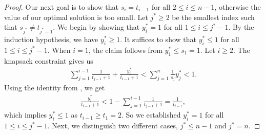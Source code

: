 \documentclass[pdflatex]{sn-jnl}
\theoremstyle{thmstyleone}%
\theoremstyle{thmstyletwo}%
\theoremstyle{thmstylethree}%
\begin{document}
\begin{proof}
		Our next goal is to show that $s_i = t_{i-1}$ for all $2\leq i\leq n-1$, otherwise the value of our optimal solution is too small. 
		Let $j^*\geq 2$ be the smallest index such that $s_{j^*} \neq t_{{j^*}-1}$. 
		We begin by showing that $y^*_i = 1$ for all $1\leq i\leq j^*-1$. By the induction hypothesis, we have $y^*_i \geq 1$. 
		It suffices to show that $y^*_i\leq 1$ for all $1\leq i \leq j^* - 1$. When $i = 1$, the claim follows from $y_1^*\leq s_1 = 1$. Let $i \geq 2$. The knapsack constraint gives us
		\begin{align*}
			\sum_{j=1}^{i-1}\frac{1}{t_{j-1} + 1} + \frac{y^*_{i}}{t_{i-1} + 1} < \sum_{j=1}^n \frac{1}{s_j}y^*_j < 1.
		\end{align*}
		Using the identity from \cite{sylvestersequence1880sylvester}, we get 
		\begin{align*}
			\frac{y^*_{i}}{t_{i-1} + 1} < 1 - \sum_{j=1}^{i-1}\frac{1}{t_{j-1} + 1} = \frac{1}{t_{i-1}},
		\end{align*}
		which implies $y^*_{i} \leq 1$ as $t_{i-1}\geq t_1 = 2$. So we established $y^*_i = 1$ for all $1\leq i\leq j^*-1$. Next, we distinguish two different cases, $j^* \leq n - 1$ and $j^* = n$. 
		

\end{proof}
\end{document}
